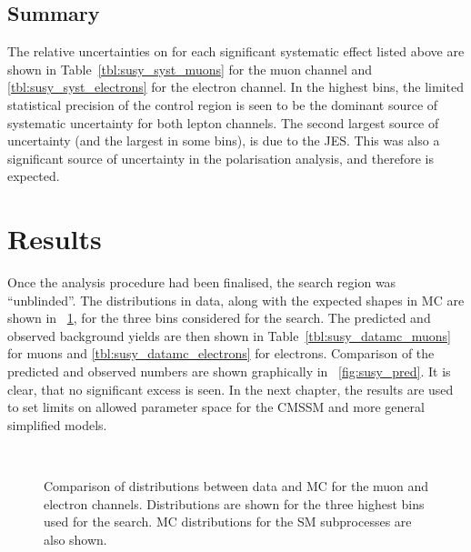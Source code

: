 \subsection{Summary}
The relative uncertainties on \RCS for each significant systematic effect listed
above are shown in Table~\ref{tbl:susy_syst_muons} for the muon channel and
\ref{tbl:susy_syst_electrons} for the electron channel. In the highest \STlep
bins, the limited statistical precision of the control region is seen to be the
dominant source of systematic uncertainty for both lepton channels. The second
largest source of uncertainty (and the largest in some bins), is due to the
\ac{JES}. This was also a significant source of uncertainty in the \PW
polarisation analysis, and therefore is expected.




\section{Results}
Once the analysis procedure had been finalised, the search region was
``unblinded''. The \LP distributions in data, along with the expected shapes in
\ac{MC} are shown in \fig~\ref{fig:susy_datamc}, for the three \STlep bins
considered for the search. The predicted and observed background yields are then
shown in Table~\ref{tbl:susy_datamc_muons} for muons and
\ref{tbl:susy_datamc_electrons} for electrons. Comparison of the predicted and
observed numbers are shown graphically in \fig~\ref{fig:susy_pred}. It is clear,
that no significant excess is seen. In the next chapter, the results are used to
set limits on allowed parameter space for the \ac{CMSSM} and more general
simplified models.

\begin{figure}
  \centering {}\quad
  \quad
  \\
  \quad
  \quad
  \caption[Comparison of \LP distributions between data and \acs{MC}]{Comparison
    of \LP distributions between data and \ac{MC} for the muon and electron
    channels. Distributions are shown for the three highest \STlep bins used for
    the search. \ac{MC} distributions for the \ac{SM} subprocesses are also
    shown.}
\label{fig:susy_datamc}
\end{figure}

